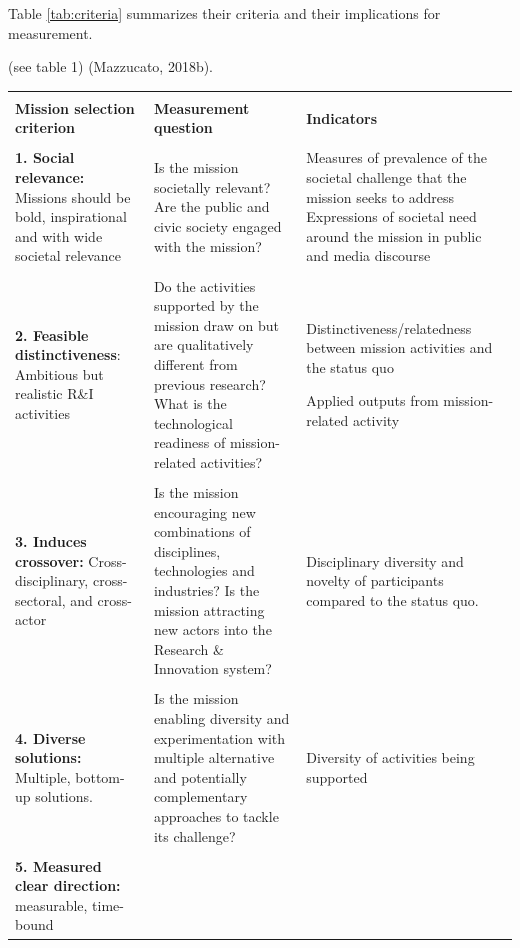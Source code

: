 \documentclass[11pt]{article}
\begin{document}
Table \ref{tab:criteria} summarizes their criteria and their implications for measurement.

(see table 1) (Mazzucato, 2018b).

\begin{table}[!]
\centering
\begin{tabu} to \textwidth {  X[l]  X[l]  X[l]  }
 \\
 \\
 \textbf{Mission selection criterion} & \textbf{Measurement question} & \textbf{Indicators}
 \\
 \hline
 \\
 \textbf{1. Social relevance:} Missions should be bold, inspirational and with wide societal relevance & 
 Is the mission societally relevant?
 \newline
 \newline Are the public and civic society engaged with the mission?

 & Measures of prevalence of the societal challenge that the mission seeks to address
 \newline
 \newline Expressions of societal need around the mission in public and media discourse
 \\
 \\
 \textbf{2. Feasible distinctiveness}: Ambitious but realistic R\&I activities
 & Do the activities supported by the mission draw on but are qualitatively different from previous research?
 \newline
 \newline What is the technological readiness of mission-related activities?
 
 & Distinctiveness/relatedness between mission activities and the status quo
 
 \newline Applied outputs from mission-related activity
 
 \\
 \\
 \textbf{3. Induces crossover:} Cross-disciplinary, cross-sectoral, and cross-actor
 & Is the mission encouraging new combinations of disciplines, technologies and industries? 
 \newline
 \newline
 Is the mission attracting new actors into the Research \& Innovation system?
 
 & Disciplinary diversity and novelty of participants compared to the status quo.
 \\
 \\
 \textbf{4. Diverse solutions:} Multiple, bottom-up solutions.
 & Is the mission enabling diversity and experimentation with multiple alternative and potentially complementary approaches to tackle its challenge?
 & Diversity of activities being supported
 \\
 \\
 \textbf{5. Measured clear direction:} measurable, time-bound 
 

\end{tabu}
\end{table}
\end{document}

